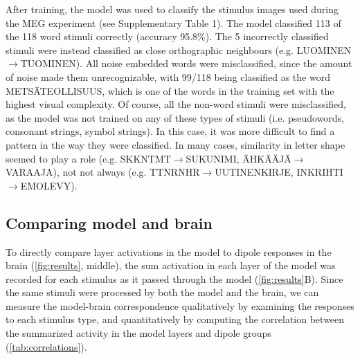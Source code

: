 \documentclass[a4paper, 10pt]{vanvliet_paper}
\begin{document}
After training, the model was used to classify the stimulus images used during the \gls{MEG} experiment (see Supplementary Table 1).
The model classified 113 of the 118 word stimuli correctly (accuracy 95.8\%).
The 5 incorrectly classified stimuli were instead classified as close orthographic neighbours (e.g. LUOMINEN$\rightarrow$TUOMINEN).
All noise embedded words were misclassified, since the amount of noise made them unrecognizable, with 99/118 being classified as the word METSÄTEOLLISUUS, which is one of the words in the training set with the highest visual complexity.
Of course, all the non-word stimuli were misclassified, as the model was not trained on any of these types of stimuli (i.e. pseudowords, consonant strings, symbol strings).
In this case, it was more difficult to find a pattern in the way they were classified.
In many cases, similarity in letter shape seemed to play a role (e.g. SKKNTMT$\rightarrow$SUKUNIMI, ÄHKÄÄJÄ$\rightarrow$VARAAJA), not not always (e.g. TTNRNHR$\rightarrow$UUTINENKIRJE, INKRIHTI$\rightarrow$EMOLEVY).


\subsection{Comparing model and brain}

To directly compare layer activations in the model to dipole responses in the brain (\autoref{fig:results}, middle), the sum activation in each layer of the model was recorded for each stimulus as it passed through the model (\autoref{fig:results}B).
Since the same stimuli were processed by both the model and the brain, we can measure the model-brain correspondence qualitatively by examining the responses to each stimulus type, and quantitatively by computing the correlation between the summarized activity in the model layers and dipole groups (\autoref{tab:correlations}).
\end{document}
